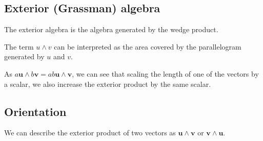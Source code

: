 
\subsection{Exterior (Grassman) algebra}

The exterior algebra is the algebra generated by the wedge product.

The term \(u\land v\) can be interpreted as the area covered by the parallelogram generated by \(u\) and \(v\).

As \(a\mathbf u\land b\mathbf v=ab \mathbf u\land \mathbf v\), we can see that scaling the length of one of the vectors by a scalar, we also increase the exterior product by the same scalar.

\subsection{Orientation}

We can describe the exterior product of two vectors as \(\mathbf u\land \mathbf v\) or \(\mathbf v \land \mathbf u\).

